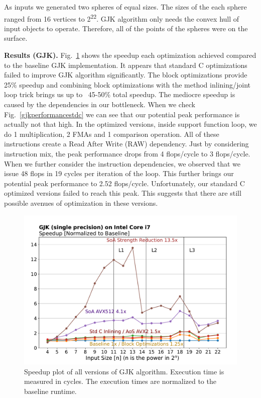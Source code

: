 \documentclass[twocolumn]{article}
\newcommand{\mypar}[1]{{\bf #1.}}
\begin{document}
As inputs we generated two spheres of equal sizes. The sizes of the each sphere ranged from 16 vertices to 2\textsuperscript{22}. GJK algorithm only needs the convex hull of input objects to operate. Therefore, all of the points of the spheres were on the surface.


\mypar{Results (GJK)}
Fig.~\ref{gjkspeedup} shows the speedup each optimization achieved compared to the baseline GJK implementation. 
It appears that standard C optimizations failed to improve GJK algorithm significantly. 
The block optimizations provide 25\% speedup and combining block optimizations with the method inlining/joint loop trick brings us up to ~45-50\% total speedup. 
The mediocre speedup is caused by the dependencies in our bottleneck. 
When we check Fig.~\ref{gjkperformancestdc} we can see that our potential peak performance is actually not that high. 
In the optimized versions, inside support function loop, we do 1 multiplication, 2 FMAs and 1 comparison operation. 
All of these instructions create a Read After Write (RAW) dependency. Just by considering instruction mix, the peak performance drops from 4 flops/cycle to 3 flops/cycle. 
When we further consider the instruction dependencies, we observed that we issue 48 flops in 19 cycles per iteration of the loop. This further brings our potential peak performance to 2.52 flops/cycle. 
Unfortunately, our standard C optimized versions failed to reach this peak. 
This suggests that there are still possible avenues of optimization in these versions.

\begin{figure}[!ht]
\includegraphics[width=\linewidth]{gjk_speedup.pdf}
\caption{Speedup plot of all versions of GJK algorithm. Execution time is measured in cycles. The execution times are normalized to the baseline runtime.}
\label{gjkspeedup}
\end{figure}
\end{document}
